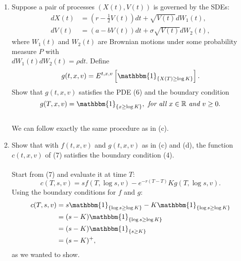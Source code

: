 \documentclass[11pt,a4,table]{article}
\begin{document}
\begin{enumerate}
\begin{enumerate}
        \item Suppose a pair of processes $(X(t), V(t))$ is governed by the SDEs:
        \begin{align}
            dX(t) &= \left( r - \frac{1}{2}V(t) \right) dt + \sqrt{V(t)} dW_1(t),\\
            dV(t) &= (a - bV(t)) dt + \sigma\sqrt{V(t)} dW_2(t),
        \end{align}
        where $W_1(t)$ and $W_2(t)$ are Brownian motions under some probability measure $P$ with \\$dW_1(t) dW_2(t) = \rho dt$. Define
        \begin{equation*}
            g(t,x,v) = E^{t,x,v}\left[\mathbbm{1}_{\{X(T)\geq\log K\}}\right].
        \end{equation*}
        Show that $g(t,x,v)$ satisfies the PDE (6) and the boundary condition
        \begin{equation*}
            g(T,x,v) = \mathbbm{1}_{\{x\geq \log K\}}, \textit{ for all } x\in\mathbb{R} \textit{ and } v\geq 0.
        \end{equation*}\\
        We can follow exactly the same procedure as in (c).
        
        \item Show that with $f(t,x,v)$ and $g(t,x,v)$ as in (c) and (d), the function $c(t,x,v)$ of (7) satisfies the boundary condition (4).\\\\
        Start from (7) and evaluate it at time $T$:
        \begin{equation*}
            c(T,s,v) = sf(T,\log s,v) - e^{-r(T-T)}Kg(T,\log s,v).
        \end{equation*}
        Using the boundary conditions for $f$ and $g$:
        \begin{align*}
            c(T,s,v) &= s\mathbbm{1}_{\{\log s\geq\log K\}} - K\mathbbm{1}_{\{\log s\geq\log K\}}\\
            &= (s-K)\mathbbm{1}_{\{\log s\geq \log K\}}\\
            &= (s-K)\mathbbm{1}_{\{s\geq K\}}\\
            &= (s-K)^+,
        \end{align*}
        as we wanted to show.
    \end{enumerate}
    

\end{enumerate}
\end{document}
